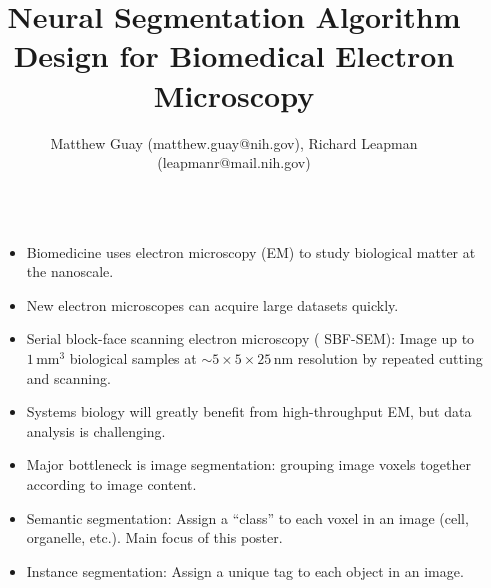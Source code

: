 \documentclass[final]{beamer}
\title{Neural Segmentation Algorithm Design for Biomedical Electron Microscopy} %
\author{{Matthew Guay (matthew.guay@nih.gov),} {Richard Leapman (leapmanr@mail.nih.gov)}}%
\institute{\textbf{Laboratory of Cellular Imaging and Macromolecular Biophysics, NIBIB, NIH}} %
\newlength{\sepwid}
\newlength{\onecolwid}
\renewcommand{\emph}[1]{{\color{nibib2} #1}}
\begin{document}
\begin{frame}[t] %

\begin{columns}[t] %

\begin{column}{\sepwid}\end{column} %


\begin{column}{\onecolwid}

\begin{tcolorbox}[title=Introduction]
\begin{itemize}
\item Biomedicine uses \emph{electron microscopy} (EM) to study biological matter at the nanoscale.
\item New electron microscopes can acquire large datasets quickly.
\item Serial block-face scanning electron microscopy (\emph{SBF-SEM}): Image up to $1\,\text{mm}^3$ biological samples at $\sim 5\times 5\times 25\,\text{nm}$ resolution by repeated cutting and scanning.
\item \emph{Systems biology} will greatly benefit from high-throughput EM, but data analysis is challenging.

\item Major bottleneck is \emph{image segmentation}: grouping image voxels together according to image content.
\item \emph{Semantic} segmentation: Assign a ``class'' to each voxel in an image (cell, organelle, etc.). Main focus of this poster.
\item \emph{Instance} segmentation: Assign a unique tag to each object in an image.
\end{itemize}
\end{tcolorbox}


\end{column}
\end{columns}
\end{frame}
\end{document}
